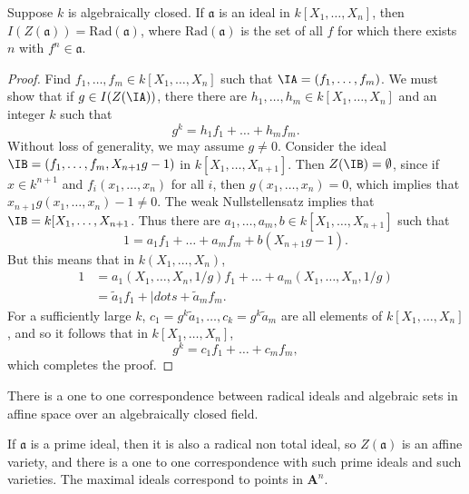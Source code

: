 \begin{theorem}
    Suppose $k$ is algebraically closed. If $\mathfrak{a}$ is an ideal in $k[X_1, \dots, X_n]$, then $I(Z(\mathfrak{a})) = \text{Rad}(\mathfrak{a})$, where $\text{Rad}(\mathfrak{a})$ is the set of all $f$ for which there exists $n$ with $f^n \in \mathfrak{a}$.
\end{theorem}
\begin{proof}
    Find $f_1,\dots,f_m \in k[X_1,\dots,X_n]$ such that $\IA = (f_1,\dots,f_m)$. We must show that if $g \in I(Z(\IA))$, there there are $h_1,\dots,h_m \in k[X_1,\dots,X_n]$ and an integer $k$ such that
    \[ g^k = h_1f_1 + \dots + h_mf_m. \]
    Without loss of generality, we may assume $g \neq 0$. Consider the ideal $\IB = (f_1, \dots, f_m, X_{n+1}g - 1)$ in $k[X_1,\dots,X_{n+1}]$. Then $Z(\IB) = \emptyset$, since if $x \in k^{n+1}$ and $f_i(x_1,\dots,x_n)$ for all $i$, then $g(x_1,\dots,x_n) = 0$, which implies that $x_{n+1}g(x_1,\dots,x_n) - 1 \neq 0$. The weak Nullstellensatz implies that $\IB = k[X_1,\dots,X_{n+1}$. Thus there are $a_1,\dots,a_m,b \in k[X_1,\dots,X_{n+1}]$ such that
    \[ 1 = a_1f_1 + \dots + a_mf_m + b (X_{n+1} g - 1). \]
    But this means that in $k(X_1,\dots,X_n)$,
    \begin{align*}
        1 &= a_1(X_1,\dots,X_n,1/g) f_1 + \dots + a_m(X_1,\dots,X_n,1/g)\\
        &= \tilde{a}_1 f_1 + |dots + \tilde{a}_m f_m.
    \end{align*}
    For a sufficiently large $k$, $c_1 = g^k \tilde{a}_1, \dots, c_k = g^k \tilde{a}_m$ are all elements of $k[X_1,\dots,X_n]$, and so it follows that in $k[X_1,\dots,X_n]$,
    \[ g^k = c_1f_1 + \dots + c_mf_m, \]
    which completes the proof.
\end{proof}

\begin{corollary}
    There is a one to one correspondence between radical ideals and algebraic sets in affine space over an algebraically closed field.
\end{corollary}

\begin{corollary}
    If $\mathfrak{a}$ is a prime ideal, then it is also a radical non total ideal, so $Z(\mathfrak{a})$ is an affine variety, and there is a one to one correspondence with such prime ideals and such varieties. The maximal ideals correspond to points in $\mathbf{A}^n$.
\end{corollary}

